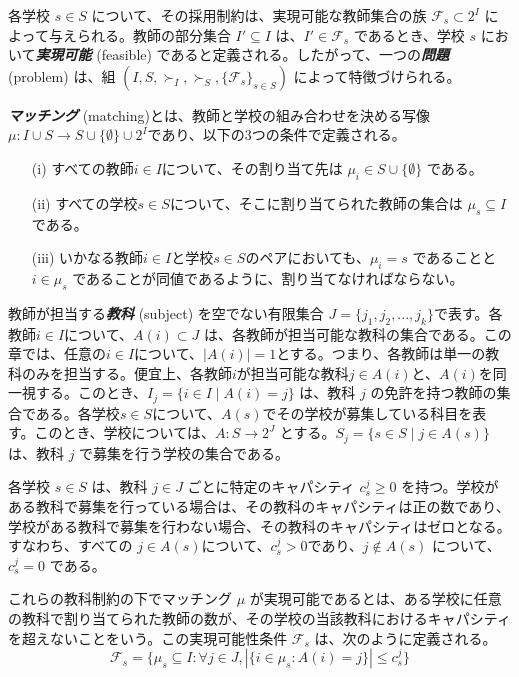 \documentclass[12pt, a4paper]{article}
\theoremstyle{definition}
\theoremstyle{remark}
\theoremstyle{plain}
\begin{document}
各学校 $s \in S$ について、その採用制約は、実現可能な教師集合の族 $\mathcal{F}_s \subset 2^{I}$ によって与えられる。教師の部分集合 $I' \subseteq I$ は、$I' \in \mathcal{F}_s$ であるとき、学校 $s$ において\textbf{\textit{実現可能}} (feasible) であると定義される。したがって、一つの\textbf{\textit{問題}} (problem) は、組 $(I, S, \succ_I, \succ_S, \{\mathcal{F}_s\}_{s \in S})$ によって特徴づけられる。

\textbf{\textit{マッチング}} (matching)とは、教師と学校の組み合わせを決める写像$ \mu : I \cup S \to S \cup \{\emptyset\} \cup 2^{I}$であり、以下の3つの条件で定義される。
\begin{itemize}
    \item[(i)] すべての教師$i \in I$について、その割り当て先は $\mu_i \in S \cup \{\emptyset\}$ である。
    \item[(ii)] すべての学校$s \in S$について、そこに割り当てられた教師の集合は $\mu_s \subseteq I$ である。
    \item[(iii)] いかなる教師$i \in I$と学校$s \in S$のペアにおいても、$\mu_i = s$ であることと $i \in \mu_s$ であることが同値であるように、割り当てなければならない。
\end{itemize}



教師が担当する\textbf{\textit{教科}} (subject) を空でない有限集合 $J = \{j_1, j_2, ..., j_k\}$で表す。各教師$i \in I$について、$A(i) \subset J$ は、各教師が担当可能な教科の集合である。この章では、任意の$i \in I$について、$|A(i)| = 1$とする。つまり、各教師は単一の教科のみを担当する。便宜上、各教師$i$が担当可能な教科$j \in A(i)$と、$A(i)$を同一視する。このとき、$I_j = \{i \in I \mid A(i) = j\}$ は、教科 $j$ の免許を持つ教師の集合である。各学校$s \in S$について、$A(s)$でその学校が募集している科目を表す。このとき、学校については、$A: S \to 2^J$ とする。$S_j = \{s \in S \mid j \in A(s)\}$ は、教科 $j$ で募集を行う学校の集合である。

各学校 $s \in S$ は、教科 $j \in J$ ごとに特定のキャパシティ $c^j_s \geq 0$ を持つ。学校がある教科で募集を行っている場合は、その教科のキャパシティは正の数であり、学校がある教科で募集を行わない場合、その教科のキャパシティはゼロとなる。すなわち、すべての $j \in A(s)$について、$c^j_s > 0$であり、$j \notin A(s)$ について、$c^j_s = 0$ である。

これらの教科制約の下でマッチング $\mu$ が実現可能であるとは、ある学校に任意の教科で割り当てられた教師の数が、その学校の当該教科におけるキャパシティを超えないことをいう。この実現可能性条件 $\mathcal{F}_s$ は、次のように定義される。
\[
\mathcal{F}_s = \{\mu_s \subseteq I : \forall j \in J, |\{i \in \mu_s : A(i) = j \}| \leq c^j_s \}
\]
\end{document}
